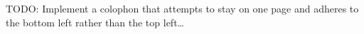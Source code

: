 \documentclass[../book]{subfiles}
\begin{document}
TODO: Implement a colophon that attempts to stay on one page and adheres to the bottom left rather than the top left…

\thispagestyle{empty}
\epubpage
\end{document}
